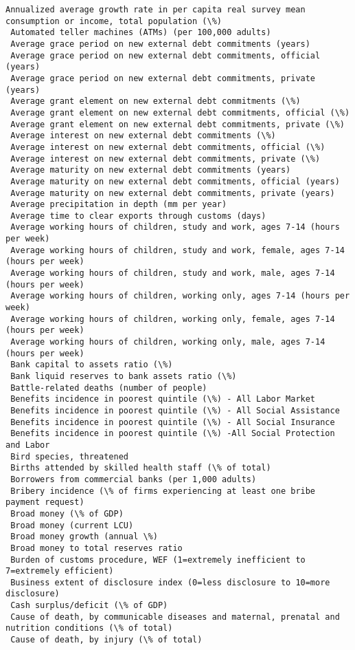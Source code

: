 \documentclass[11pt]{article}
\begin{document}
\begin{Verbatim}[commandchars=\\\{\}]
 Annualized average growth rate in per capita real survey mean consumption or income, total population (\%)
 Automated teller machines (ATMs) (per 100,000 adults)
 Average grace period on new external debt commitments (years)
 Average grace period on new external debt commitments, official (years)
 Average grace period on new external debt commitments, private (years)
 Average grant element on new external debt commitments (\%)
 Average grant element on new external debt commitments, official (\%)
 Average grant element on new external debt commitments, private (\%)
 Average interest on new external debt commitments (\%)
 Average interest on new external debt commitments, official (\%)
 Average interest on new external debt commitments, private (\%)
 Average maturity on new external debt commitments (years)
 Average maturity on new external debt commitments, official (years)
 Average maturity on new external debt commitments, private (years)
 Average precipitation in depth (mm per year)
 Average time to clear exports through customs (days)
 Average working hours of children, study and work, ages 7-14 (hours per week)
 Average working hours of children, study and work, female, ages 7-14 (hours per week)
 Average working hours of children, study and work, male, ages 7-14 (hours per week)
 Average working hours of children, working only, ages 7-14 (hours per week)
 Average working hours of children, working only, female, ages 7-14 (hours per week)
 Average working hours of children, working only, male, ages 7-14 (hours per week)
 Bank capital to assets ratio (\%)
 Bank liquid reserves to bank assets ratio (\%)
 Battle-related deaths (number of people)
 Benefits incidence in poorest quintile (\%) - All Labor Market
 Benefits incidence in poorest quintile (\%) - All Social Assistance
 Benefits incidence in poorest quintile (\%) - All Social Insurance
 Benefits incidence in poorest quintile (\%) -All Social Protection and Labor
 Bird species, threatened
 Births attended by skilled health staff (\% of total)
 Borrowers from commercial banks (per 1,000 adults)
 Bribery incidence (\% of firms experiencing at least one bribe payment request)
 Broad money (\% of GDP)
 Broad money (current LCU)
 Broad money growth (annual \%)
 Broad money to total reserves ratio
 Burden of customs procedure, WEF (1=extremely inefficient to 7=extremely efficient)
 Business extent of disclosure index (0=less disclosure to 10=more disclosure)
 Cash surplus/deficit (\% of GDP)
 Cause of death, by communicable diseases and maternal, prenatal and nutrition conditions (\% of total)
 Cause of death, by injury (\% of total)

\end{Verbatim}
\end{document}
